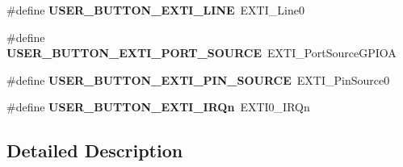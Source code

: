 \begin{DoxyCompactItemize}
\item 
\hypertarget{group___s_t_m32_f4___d_i_s_c_o_v_e_r_y___l_o_w___l_e_v_e_l___b_u_t_t_o_n_gac41d04c2244ba780e4749991c85d1e9a}{\#define {\bfseries U\-S\-E\-R\-\_\-\-B\-U\-T\-T\-O\-N\-\_\-\-E\-X\-T\-I\-\_\-\-L\-I\-N\-E}~E\-X\-T\-I\-\_\-\-Line0}\label{group___s_t_m32_f4___d_i_s_c_o_v_e_r_y___l_o_w___l_e_v_e_l___b_u_t_t_o_n_gac41d04c2244ba780e4749991c85d1e9a}

\item 
\hypertarget{group___s_t_m32_f4___d_i_s_c_o_v_e_r_y___l_o_w___l_e_v_e_l___b_u_t_t_o_n_gadb21b50e395cd0cbede08485aa46a7e1}{\#define {\bfseries U\-S\-E\-R\-\_\-\-B\-U\-T\-T\-O\-N\-\_\-\-E\-X\-T\-I\-\_\-\-P\-O\-R\-T\-\_\-\-S\-O\-U\-R\-C\-E}~E\-X\-T\-I\-\_\-\-Port\-Source\-G\-P\-I\-O\-A}\label{group___s_t_m32_f4___d_i_s_c_o_v_e_r_y___l_o_w___l_e_v_e_l___b_u_t_t_o_n_gadb21b50e395cd0cbede08485aa46a7e1}

\item 
\hypertarget{group___s_t_m32_f4___d_i_s_c_o_v_e_r_y___l_o_w___l_e_v_e_l___b_u_t_t_o_n_ga228dea1ae32daacecea1c9344ba93cd3}{\#define {\bfseries U\-S\-E\-R\-\_\-\-B\-U\-T\-T\-O\-N\-\_\-\-E\-X\-T\-I\-\_\-\-P\-I\-N\-\_\-\-S\-O\-U\-R\-C\-E}~E\-X\-T\-I\-\_\-\-Pin\-Source0}\label{group___s_t_m32_f4___d_i_s_c_o_v_e_r_y___l_o_w___l_e_v_e_l___b_u_t_t_o_n_ga228dea1ae32daacecea1c9344ba93cd3}

\item 
\hypertarget{group___s_t_m32_f4___d_i_s_c_o_v_e_r_y___l_o_w___l_e_v_e_l___b_u_t_t_o_n_ga2e6e65a053529869d1c370610825d98f}{\#define {\bfseries U\-S\-E\-R\-\_\-\-B\-U\-T\-T\-O\-N\-\_\-\-E\-X\-T\-I\-\_\-\-I\-R\-Qn}~E\-X\-T\-I0\-\_\-\-I\-R\-Qn}\label{group___s_t_m32_f4___d_i_s_c_o_v_e_r_y___l_o_w___l_e_v_e_l___b_u_t_t_o_n_ga2e6e65a053529869d1c370610825d98f}

\end{DoxyCompactItemize}


\subsection{Detailed Description}
